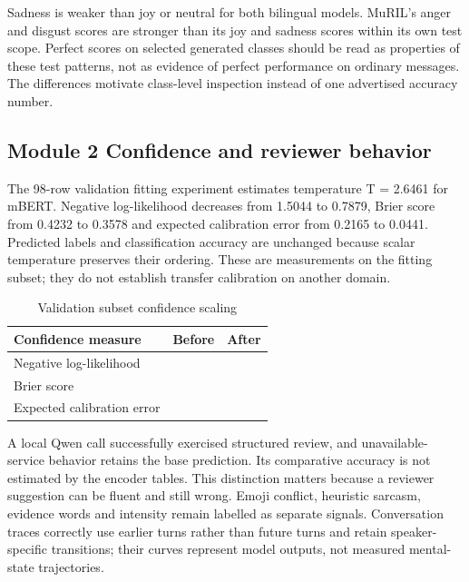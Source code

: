 \documentclass[conference]{IEEEtran}
\begin{document}
Sadness is weaker than joy or neutral for both bilingual models. MuRIL's anger and disgust scores are stronger than its joy and sadness scores within its own test scope. Perfect scores on selected generated classes should be read as properties of these test patterns, not as evidence of perfect performance on ordinary messages. The differences motivate class-level inspection instead of one advertised accuracy number.

\subsection{Module 2 Confidence and reviewer behavior}

The 98-row validation fitting experiment estimates temperature T = 2.6461 for mBERT. Negative log-likelihood decreases from 1.5044 to 0.7879, Brier score from 0.4232 to 0.3578 and expected calibration error from 0.2165 to 0.0441. Predicted labels and classification accuracy are unchanged because scalar temperature preserves their ordering. These are measurements on the fitting subset; they do not establish transfer calibration on another domain.

\begin{table}[!t]
\caption{Validation subset confidence scaling}
\centering
\footnotesize
\begin{tabularx}{\columnwidth}{@{}>{\raggedright\arraybackslash}X>{\raggedleft\arraybackslash}X>{\raggedleft\arraybackslash}X@{}}
\toprule
\textbf{Confidence measure} & \textbf{Before} & \textbf{After} \\
\midrule
Negative log-likelihood & 1.5044 & 0.7879 \\
Brier score & 0.4232 & 0.3578 \\
Expected calibration error & 0.2165 & 0.0441 \\
\bottomrule
\end{tabularx}
\end{table}


A local Qwen call successfully exercised structured review, and unavailable-service behavior retains the base prediction. Its comparative accuracy is not estimated by the encoder tables. This distinction matters because a reviewer suggestion can be fluent and still wrong. Emoji conflict, heuristic sarcasm, evidence words and intensity remain labelled as separate signals. Conversation traces correctly use earlier turns rather than future turns and retain speaker-specific transitions; their curves represent model outputs, not measured mental-state trajectories.
\end{document}
